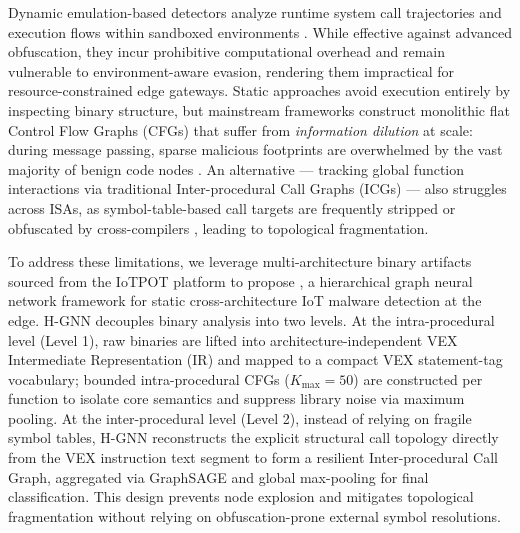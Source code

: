 \documentclass[conference]{IEEEtran}
\begin{document}
Dynamic emulation-based detectors analyze runtime system call
trajectories and execution flows within sandboxed environments
\cite{b3,b9}. While effective against advanced obfuscation,
they incur prohibitive computational overhead and remain
vulnerable to environment-aware evasion, rendering them
impractical for resource-constrained edge gateways. Static
approaches avoid execution entirely by inspecting binary
structure, but mainstream frameworks construct monolithic flat
Control Flow Graphs (CFGs) that suffer from \textit{information
dilution} at scale: during message passing, sparse malicious
footprints are overwhelmed by the vast majority of benign code
nodes \cite{b6}. 
An alternative — tracking global function interactions via traditional 
Inter-procedural Call Graphs (ICGs) — also struggles across ISAs, as symbol-table-based 
call targets are frequently stripped or obfuscated by cross-compilers \cite{b4}, 
leading to topological fragmentation.

To address these limitations, we leverage multi-architecture binary 
artifacts sourced from the IoTPOT platform \cite{b7} to propose , a
hierarchical graph neural network framework for static
cross-architecture IoT malware detection at the edge. H-GNN
decouples binary analysis into two levels. At the
intra-procedural level (Level 1), raw binaries are lifted into
architecture-independent VEX Intermediate Representation (IR)
and mapped to a compact VEX statement-tag vocabulary; bounded intra-procedural
CFGs ($K_{\max} = 50$) are constructed per function to isolate
core semantics and suppress library noise via maximum pooling. At the
inter-procedural level (Level 2), instead of relying on fragile symbol tables, 
H-GNN reconstructs the explicit structural call topology directly from 
the VEX instruction text segment to form a resilient Inter-procedural Call Graph, 
aggregated via GraphSAGE and global max-pooling for final classification. 
This design prevents node explosion and mitigates topological fragmentation without 
relying on obfuscation-prone external symbol resolutions.
\end{document}
